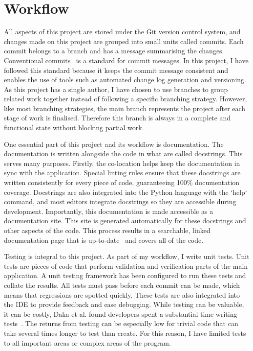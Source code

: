 \documentclass[]{final_report}
\begin{document}
\section{Workflow}


All aspects of this project are stored under the Git version control system, and changes made on this project are grouped into small units called commits. Each commit belongs to a branch and has a message summarising the changes. Conventional commits~\cite{conventionalCommitsOnline} is a standard for commit messages. In this project, I have followed this standard because it keeps the commit message consistent and enables the use of tools such as automated change log generation and versioning. As this project has a single author, I have chosen to use branches to group related work together instead of following a specific branching strategy. However, like most branching strategies, the main branch represents the project after each stage of work is finalised. Therefore this branch is always in a complete and functional state without blocking partial work. 

One essential part of this project and its workflow is documentation. The documentation is written alongside the code in what are called docstrings. This serves many purposes. Firstly, the co-location helps keep the documentation in sync with the application. Special linting rules ensure that these docstrings are written consistently for every piece of code, guaranteeing 100\% documentation coverage. Docstrings are also integrated into the Python language with the `help` command, and most editors integrate docstrings so they are accessible during development. Importantly, this documentation is made accessible as a documentation site. This site is generated automatically for these docstrings and other aspects of the code. This process results in a searchable, linked documentation page that is up-to-date~\cite{pythonAutoDoc} and covers all of the code. 

\newpage
Testing is integral to this project. As part of my workflow, I write unit tests. Unit tests are pieces of code that perform validation and verification parts of the main application. A unit testing framework has been configured to run these tests and collate the results. All tests must pass before each commit can be made, which means that regressions are spotted quickly. These tests are also integrated into the IDE to provide feedback and ease debugging.  While testing can be valuable, it can be costly, Daka et al. found developers spent a substantial time writing tests~\cite{unitTestingSurvey}. The returns from testing can be especially low for trivial code that can take several times longer to test than create. For this reason, I have limited tests to all important areas or complex areas of the program.  
\end{document}
